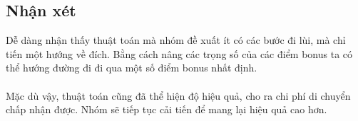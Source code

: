 \documentclass[12pt]{article}
\begin{document}
\subsection{Nhận xét}
Dễ dàng nhận thấy thuật toán mà nhóm đề xuất ít có các bước đi lùi, mà chỉ tiến một hướng về đích. Bằng cách nâng các trọng số của các điểm bonus ta có thể hướng đường đi đi qua một số điểm bonus nhất định.
\\\\
Mặc dù vậy, thuật toán cũng đã thể hiện độ hiệu quả, cho ra chi phí di chuyển chấp nhận được. Nhóm sẽ tiếp tục cải tiến để mang lại hiệu quả cao hơn.



\end{document}
